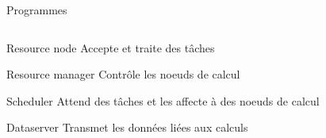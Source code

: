 \documentclass{beamer}
\begin{document}
\begin{frame}{Programmes}
\begin{columns}
\begin{column}[r]{0.5\linewidth}
        \begin{block}{Resource node}
            Accepte et traite des t\^aches
        \end{block}
        \begin{block}{Resource manager}
            Contrôle les noeuds de calcul
        \end{block}
        \begin{alertblock}{Scheduler}
            Attend des t\^aches et les affecte à des noeuds de calcul
        \end{alertblock}
        \begin{exampleblock}{Dataserver}
            Transmet les données liées aux calculs
        \end{exampleblock}
        
	\end{column}
	\end{columns}
\end{frame}
\end{document}
